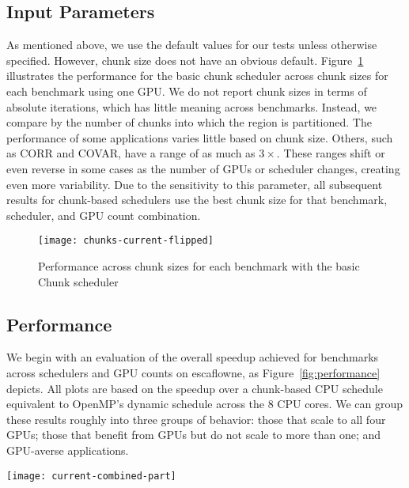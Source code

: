 \subsection{Input Parameters}

As mentioned above, we use the default values for our tests unless otherwise
specified. However, chunk size does not have an obvious default.
Figure~\ref{fig:chunk-size} illustrates the performance for the basic chunk
scheduler across chunk sizes for each benchmark using one GPU. We do not
report chunk sizes in terms of absolute iterations, which has little meaning
across benchmarks. Instead, we compare by the number of chunks into which the
region is partitioned. The performance of some applications varies little
based on chunk size. Others, such as CORR and COVAR, have a range of as much as
$3\times$. These ranges shift or even reverse in some cases as the number of
GPUs or scheduler changes, creating even more variability. Due to the
sensitivity to this parameter, all subsequent results for chunk-based
schedulers use the best chunk size for that benchmark, scheduler, and GPU
count combination.

\begin{figure}[t]
        \texttt{[image: chunks-current-flipped]}
        \caption{Performance across chunk sizes for each benchmark with the
        basic Chunk scheduler}
	\label{fig:chunk-size}
\end{figure}



\subsection{\tsar Performance}
\label{sec:orig}

We begin with an evaluation of the overall speedup achieved for benchmarks
across schedulers and GPU counts on escaflowne, as
Figure~\ref{fig:performance} depicts.  All plots are based on the speedup over
a chunk-based CPU schedule equivalent to OpenMP's dynamic schedule across the 8
CPU cores. We can group these results roughly into three groups of behavior:
those that scale to all four GPUs; those that benefit from GPUs but do not
scale to more than one; and GPU-averse applications.


\begin{figure*}[p]
        \texttt{[image: current-combined-part]}
        \caption{Performance across schedulers and number of GPUs for all
        benchmarks, normalized to CPU OpenMP across 8 cores.}
	\label{fig:performance}
\end{figure*}

